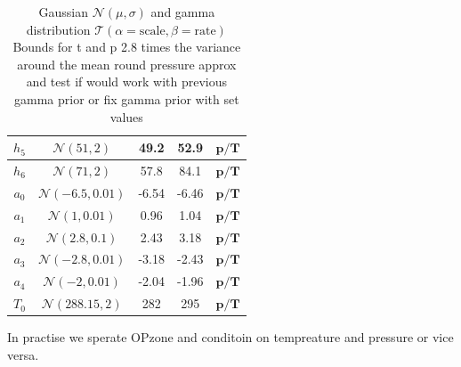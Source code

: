 \begin{table}
\begin{tabular}{ |c||c|c|c|c|   }
		$h_{5}$ &  $\mathcal{N}(51,2)$&49.2 &52.9&$\bm{p/T}$\\ \hline
		$h_{6}$ &  $\mathcal{N}(71,2)$&57.8 &84.1&$\bm{p/T}$\\ \hline
		$a_{0}$ &  $\mathcal{N}(-6.5,0.01)$&-6.54 &-6.46&$\bm{p/T}$\\ \hline
		$a_{1}$ &  $\mathcal{N}(1,0.01)$&0.96 &1.04&$\bm{p/T}$\\ \hline
		$a_{2}$ &  $\mathcal{N}(2.8,0.1)$&2.43 &3.18&$\bm{p/T}$\\ \hline
		$a_{3}$ &  $\mathcal{N}(-2.8,0.01)$&-3.18 &-2.43&$\bm{p/T}$\\ \hline
		$a_{4}$ & $\mathcal{N}(-2,0.01)$ &-2.04 &-1.96&$\bm{p/T}$\\ \hline
		$T_{0}$ &  $\mathcal{N}(288.15,2)$& 282 &295&$\bm{p/T}$\\
		\hline
	\end{tabular}
	\caption{Gaussian $\mathcal{N}(\mu,\sigma)$ and gamma distribution $\mathcal{T}(\alpha = \text{scale}, \beta = \text{rate})$
		Bounds for t and p 2.8 times the variance around the mean
		round pressure approx and  test if would work with previous gamma prior or fix gamma prior with set values}
	\label{tab:1}
\end{table}

In practise we sperate OPzone and conditoin on tempreature and pressure  or vice versa. 
